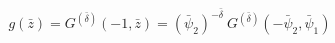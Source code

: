 \begin{equation}
g(\bar{z}) = G^{(\bar{\delta})}(-1,\bar{z})= (\bar{\psi}_{2})^{-\bar{\delta}}~
G^{(\bar{\delta})}(-\bar{\psi}_{2},\bar{\psi}_{1})
\end{equation}


